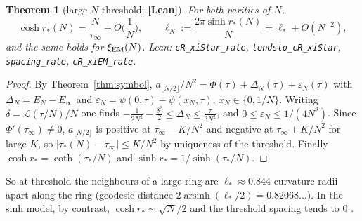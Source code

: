 \documentclass[11pt]{article}
\newtheorem{theorem}{Theorem}[section]
\theoremstyle{definition}
\theoremstyle{remark}
\newcommand{\st}[1]{\textbf{[#1]}}
\newcommand{\lean}[1]{\nolinkurl{#1}}
\newcommand{\Lan}{\mathcal L}
\begin{document}
\begin{theorem}[large-$N$ threshold; \st{Lean}]\label{thm:largeN}
For both parities of $N$,
\[
\cosh r_*(N)=\frac N{\tau_\infty}+O\Big(\frac1N\Big),\qquad \ell_N:=\frac{2\pi\sinh r_*(N)}N=\ell_*+O(N^{-2}),
\]
and the same holds for $\xi_{\rm EM}(N)$. Lean: \lean{cR_xiStar_rate}, \lean{tendsto_cR_xiStar}, \lean{spacing_rate},
\lean{cR_xiEM_rate}.
\end{theorem}
\begin{proof}
By Theorem~\ref{thm:symbol}, $a_{\lfloor N/2\rfloor}/N^2=\Phi(\tau)+\Delta_N(\tau)+\varepsilon_N(\tau)$ with
$\Delta_N=E_N-E_\infty$ and $\varepsilon_N=\psi(0,\tau)-\psi(x_N,\tau)$, $x_N\in\{0,1/N\}$. Writing $\delta=\Lan(\tau/N)/N$ one finds
$-\frac1{2N^2}-\frac{\delta^2}2\le\Delta_N\le\frac\tau{3N^2}$, and $0\le\varepsilon_N\le1/(4N^2)$. Since $\Phi'(\tau_\infty)\ne0$,
$a_{\lfloor N/2\rfloor}$ is positive at $\tau_\infty-K/N^2$ and negative at $\tau_\infty+K/N^2$ for large $K$, so
$|\tau_*(N)-\tau_\infty|\le K/N^2$ by uniqueness of the threshold. Finally $\cosh r_*=\coth(\tau_*/N)$ and
$\sinh r_*=1/\sinh(\tau_*/N)$.
\end{proof}
So at threshold the neighbours of a large ring are $\ell_*\approx0.844$ curvature radii apart along the ring (geodesic distance
$2\operatorname{arsinh}(\ell_*/2)=0.82068\ldots$). In the sinh model, by contrast, $\cosh r_*\sim\sqrt N/2$ and the threshold
spacing tends to $0$ \cite{MontaldiTokieda2013}.
\end{document}
